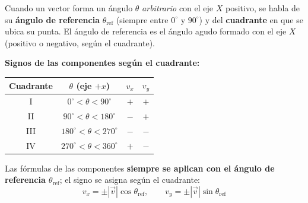 \documentclass[12pt, letterpaper]{article}
\providecommand{\sen}{\sin}
\begin{document}
\begin{cuadroteoria}
  Cuando un vector forma un ángulo $\theta$ \emph{arbitrario} con el eje $X$ positivo, se habla de su \textbf{ángulo de referencia} $\theta_{\text{ref}}$ (siempre entre $0^{\circ}$ y $90^{\circ}$) y del \textbf{cuadrante} en que se ubica su punta.  El ángulo de referencia es el ángulo agudo formado con el eje $X$ (positivo o negativo, según el cuadrante).

  \begin{center}
  \end{center}
\end{cuadroteoria}
\newpage
\begin{cuadroteoria}
  \textbf{Signos de las componentes según el cuadrante:}
  \begin{center}
    \begin{tabular}{cccc}
      \toprule
      Cuadrante & $\theta$ (eje $+x$)              & $v_x$ & $v_y$ \\
      \midrule
      I         & $0^\circ < \theta < 90^\circ$    & $+$   & $+$   \\
      II        & $90^\circ < \theta < 180^\circ$  & $-$   & $+$   \\
      III       & $180^\circ < \theta < 270^\circ$ & $-$   & $-$   \\
      IV        & $270^\circ < \theta < 360^\circ$ & $+$   & $-$   \\
      \bottomrule
    \end{tabular}
  \end{center}

  Las fórmulas de las componentes \textbf{siempre se aplican con el ángulo de referencia $\theta_{\text{ref}}$}; el signo se asigna según el cuadrante:
  $$v_x = \pm |\vec{v}|\cos\theta_{\text{ref}}, \qquad v_y = \pm |\vec{v}|\sen\theta_{\text{ref}}$$
\end{cuadroteoria}
\end{document}
